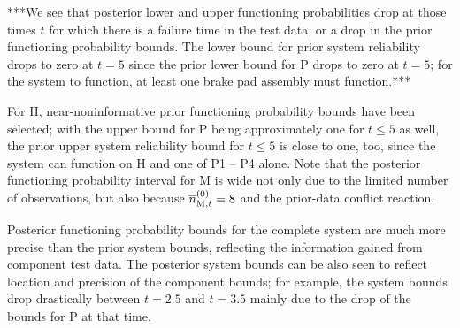 \documentclass[12pt, a4paper]{elsarticle}
\begin{document}
***We see that posterior lower and upper functioning probabilities drop at those times $t$
for which there is a failure time in the test data,
or a drop in the prior functioning probability bounds.
The lower bound for prior system reliability drops to zero at $t=5$
since the prior lower bound for P drops to zero at $t=5$;
for the system to function, at least one brake pad assembly must function.***

For H, near-noninformative prior functioning probability bounds have been selected;
with the upper bound for P being approximately one for $t \le 5$ as well,
the prior upper system reliability bound for $t \le 5$ is close to one, too,
since the system can function on H and one of P1 -- P4 alone.
Note that the posterior functioning probability interval for M
is wide not only due to the limited number of observations,
but also because $\overline{n}^{(0)}_{\text{M},t} = 8$ and the prior-data conflict reaction.

Posterior functioning probability bounds for the complete system
are much more precise than the prior system bounds,
reflecting the information gained from component test data.
The posterior system bounds can be also seen to reflect location and precision of the component bounds;
for example, the system bounds drop drastically between $t=2.5$ and $t=3.5$
mainly due to the drop of the bounds for P at that time.
\end{document}
